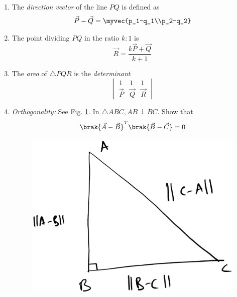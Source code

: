 \begin{enumerate}[label=\arabic*.,ref=\thesubsection.\theenumi]
%
\item The {\em direction vector} of the line $PQ$ is defined as 
\begin{align}
\vec{P}-\vec{Q} = \myvec{p_1-q_1\\p_2-q_2}
\end{align}
%
\item The point dividing   $PQ$  in the ratio $k:1$ is
\begin{equation}
\vec{R} = \frac{k\vec{P}+\vec{Q}}{k+1}
\end{equation}
%
\item The {\em area} of $\triangle PQR$ is the {\em determinant}
\begin{equation}
\begin{vmatrix}
1 & 1 & 1
\\
\vec{P} & \vec{Q} &\vec{R}
\end{vmatrix}
\end{equation}
\item {\em Orthogonality:} See Fig. \ref{fig:orth}.  In $\triangle ABC, AB \perp BC$. Show that
\begin{equation}
\brak{\vec{A}-\vec{B}}^T\brak{\vec{B}-\vec{C}} = 0
\label{eq:orth}
\end{equation}
\begin{figure}
\centering
\includegraphics[width=\columnwidth]{./figs/orth.eps}
\caption{}
\label{fig:orth}
\end{figure}

\end{enumerate}
